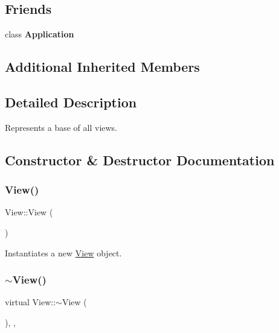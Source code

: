 \subsection*{Friends}
\begin{DoxyCompactItemize}
\item 
\mbox{\label{class_view_a23f25bcc02a0e94c2f5a4188496b04d0}} 
class {\bfseries Application}
\end{DoxyCompactItemize}
\subsection*{Additional Inherited Members}


\subsection{Detailed Description}
Represents a base of all views. 



\subsection{Constructor \& Destructor Documentation}
\mbox{\label{class_view_a44ad60a768422d3fa8fbd7576950080a}} 
\subsubsection{\texorpdfstring{View()}{View()}}
{\footnotesize\ttfamily View\+::\+View (\begin{DoxyParamCaption}{ }\end{DoxyParamCaption})\hspace{0.3cm}{\ttfamily [protected]}}



Instantiates a new \mbox{\hyperlink{class_view}{View}} object. 

\mbox{\label{class_view_a73446be92068b1fb7a4ccc29445d379f}} 
\subsubsection{\texorpdfstring{$\sim$View()}{~View()}}
{\footnotesize\ttfamily virtual View\+::$\sim$\+View (\begin{DoxyParamCaption}{ }\end{DoxyParamCaption})\hspace{0.3cm}{\ttfamily [inline]}, {\ttfamily [override]}, {\ttfamily [virtual]}}



